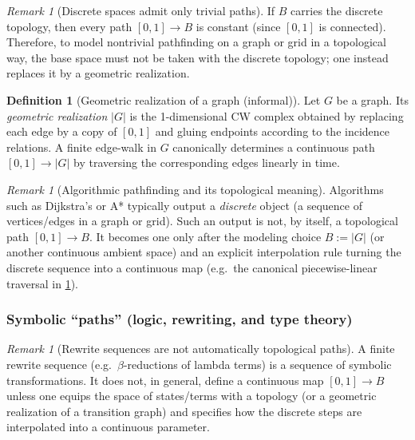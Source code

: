 \documentclass[11pt,a4paper]{article}
\theoremstyle{definition}
\newtheorem{definition}[theorem]{Definition}
\theoremstyle{remark}
\newtheorem{remark}[theorem]{Remark}
\begin{document}
\begin{remark}[Discrete spaces admit only trivial paths]
\label{rem:discrete-space-paths}
If \(B\) carries the discrete topology, then every path \([0,1]\to B\) is constant (since \([0,1]\) is connected). Therefore, to model nontrivial pathfinding on a graph or grid in a topological way, the base space must not be taken with the discrete topology; one instead replaces it by a geometric realization.
\end{remark}

\begin{definition}[Geometric realization of a graph (informal)]
\label{def:geometric-realization}
Let \(G\) be a graph. Its \emph{geometric realization} \(|G|\) is the 1-dimensional CW complex obtained by replacing each edge by a copy of \([0,1]\) and gluing endpoints according to the incidence relations. A finite edge-walk in \(G\) canonically determines a continuous path \([0,1]\to |G|\) by traversing the corresponding edges linearly in time.
\end{definition}

\begin{remark}[Algorithmic pathfinding and its topological meaning]
\label{rem:algorithmic-pathfinding}
Algorithms such as Dijkstra's or A* typically output a \emph{discrete} object (a sequence of vertices/edges in a graph or grid). Such an output is not, by itself, a topological path \([0,1]\to B\). It becomes one only after the modeling choice \(B:=|G|\) (or another continuous ambient space) and an explicit interpolation rule turning the discrete sequence into a continuous map (e.g.\ the canonical piecewise-linear traversal in \cref{def:geometric-realization}).
\end{remark}

\subsubsection{Symbolic ``paths'' (logic, rewriting, and type theory)}
\label{sec:symbolic-paths}

\begin{remark}[Rewrite sequences are not automatically topological paths]
\label{rem:rewrite-not-topological}
A finite rewrite sequence (e.g.\ \(\beta\)-reductions of lambda terms) is a sequence of symbolic transformations. It does not, in general, define a continuous map \([0,1]\to B\) unless one equips the space of states/terms with a topology (or a geometric realization of a transition graph) and specifies how the discrete steps are interpolated into a continuous parameter.
\end{remark}
\end{document}
